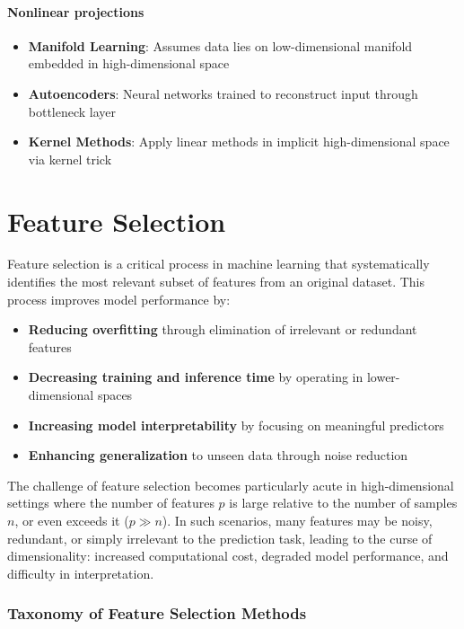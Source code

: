 \paragraph{Nonlinear projections}
\begin{itemize}
    \item \textbf{Manifold Learning}: Assumes data lies on low-dimensional manifold embedded in high-dimensional space

    \item \textbf{Autoencoders}: Neural networks trained to reconstruct input through bottleneck layer
    \item \textbf{Kernel Methods}: Apply linear methods in implicit high-dimensional space via kernel trick
\end{itemize}
\section*{Feature Selection}

Feature selection is a critical process in machine learning that systematically identifies the most relevant subset of features from an original dataset. This process improves model performance by:
\begin{itemize}
    \item \textbf{Reducing overfitting} through elimination of irrelevant or redundant features
    \item \textbf{Decreasing training and inference time} by operating in lower-dimensional spaces
    \item \textbf{Increasing model interpretability} by focusing on meaningful predictors
    \item \textbf{Enhancing generalization} to unseen data through noise reduction
\end{itemize}

The challenge of feature selection becomes particularly acute in high-dimensional settings where the number of features $p$ is large relative to the number of samples $n$, or even exceeds it ($p \gg n$). In such scenarios, many features may be noisy, redundant, or simply irrelevant to the prediction task, leading to the \alert{curse of dimensionality}: increased computational cost, degraded model performance, and difficulty in interpretation.

\subsubsection*{Taxonomy of Feature Selection Methods}

